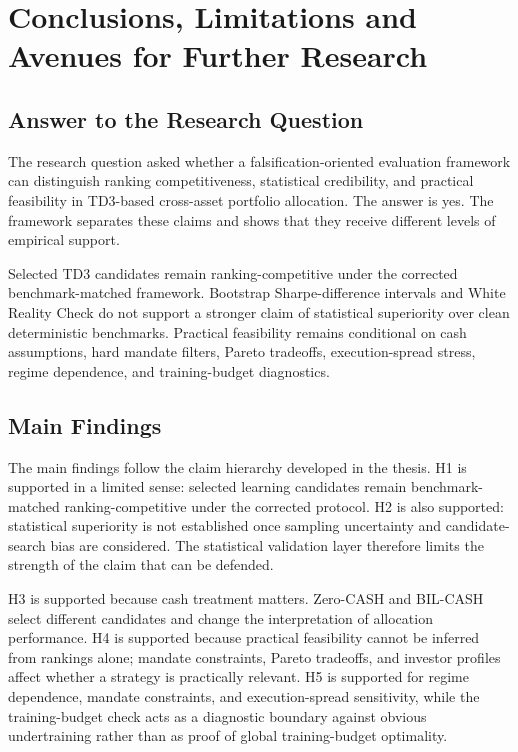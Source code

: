 \documentclass[12pt]{article}
\begin{document}
\newpage

\section{Conclusions, Limitations and Avenues for Further Research}

\subsection{Answer to the Research Question}

The research question asked whether a falsification-oriented evaluation framework can distinguish ranking competitiveness, statistical credibility, and practical feasibility in TD3-based cross-asset portfolio allocation. The answer is yes. The framework separates these claims and shows that they receive different levels of empirical support.

Selected TD3 candidates remain ranking-competitive under the corrected benchmark-matched framework. Bootstrap Sharpe-difference intervals and White Reality Check do not support a stronger claim of statistical superiority over clean deterministic benchmarks. Practical feasibility remains conditional on cash assumptions, hard mandate filters, Pareto tradeoffs, execution-spread stress, regime dependence, and training-budget diagnostics.

\subsection{Main Findings}

The main findings follow the claim hierarchy developed in the thesis. H1 is supported in a limited sense: selected learning candidates remain benchmark-matched ranking-competitive under the corrected protocol. H2 is also supported: statistical superiority is not established once sampling uncertainty and candidate-search bias are considered. The statistical validation layer therefore limits the strength of the claim that can be defended.

H3 is supported because cash treatment matters. Zero-CASH and BIL-CASH select different candidates and change the interpretation of allocation performance. H4 is supported because practical feasibility cannot be inferred from rankings alone; mandate constraints, Pareto tradeoffs, and investor profiles affect whether a strategy is practically relevant. H5 is supported for regime dependence, mandate constraints, and execution-spread sensitivity, while the training-budget check acts as a diagnostic boundary against obvious undertraining rather than as proof of global training-budget optimality.
\end{document}
